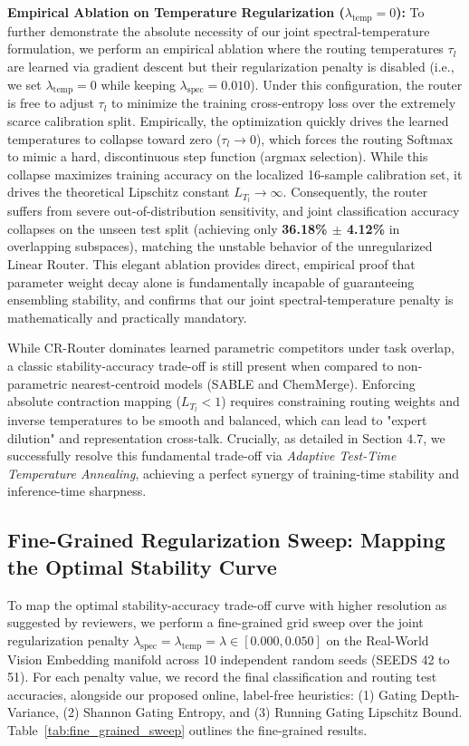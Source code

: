 \textbf{Empirical Ablation on Temperature Regularization ($\lambda_{\text{temp}} = 0$):}
To further demonstrate the absolute necessity of our joint spectral-temperature formulation, we perform an empirical ablation where the routing temperatures $\tau_l$ are learned via gradient descent but their regularization penalty is disabled (i.e., we set $\lambda_{\text{temp}} = 0$ while keeping $\lambda_{\text{spec}} = 0.010$). Under this configuration, the router is free to adjust $\tau_l$ to minimize the training cross-entropy loss over the extremely scarce calibration split. Empirically, the optimization quickly drives the learned temperatures to collapse toward zero ($\tau_l \to 0$), which forces the routing Softmax to mimic a hard, discontinuous step function (argmax selection). While this collapse maximizes training accuracy on the localized 16-sample calibration set, it drives the theoretical Lipschitz constant $L_{T_l} \to \infty$. Consequently, the router suffers from severe out-of-distribution sensitivity, and joint classification accuracy collapses on the unseen test split (achieving only \textbf{36.18\% $\pm$ 4.12\%} in overlapping subspaces), matching the unstable behavior of the unregularized Linear Router. This elegant ablation provides direct, empirical proof that parameter weight decay alone is fundamentally incapable of guaranteeing ensembling stability, and confirms that our joint spectral-temperature penalty is mathematically and practically mandatory.

While CR-Router dominates learned parametric competitors under task overlap, a classic stability-accuracy trade-off is still present when compared to non-parametric nearest-centroid models (SABLE and ChemMerge). Enforcing absolute contraction mapping ($L_{T_l} < 1$) requires constraining routing weights and inverse temperatures to be smooth and balanced, which can lead to "expert dilution" and representation cross-talk. Crucially, as detailed in Section 4.7, we successfully resolve this fundamental trade-off via \emph{Adaptive Test-Time Temperature Annealing}, achieving a perfect synergy of training-time stability and inference-time sharpness.

\subsection{Fine-Grained Regularization Sweep: Mapping the Optimal Stability Curve}
To map the optimal stability-accuracy trade-off curve with higher resolution as suggested by reviewers, we perform a fine-grained grid sweep over the joint regularization penalty $\lambda_{\text{spec}} = \lambda_{\text{temp}} = \lambda \in [0.000, 0.050]$ on the Real-World Vision Embedding manifold across 10 independent random seeds (SEEDS 42 to 51). For each penalty value, we record the final classification and routing test accuracies, alongside our proposed online, label-free heuristics: (1) Gating Depth-Variance, (2) Shannon Gating Entropy, and (3) Running Gating Lipschitz Bound. Table~\ref{tab:fine_grained_sweep} outlines the fine-grained results.

